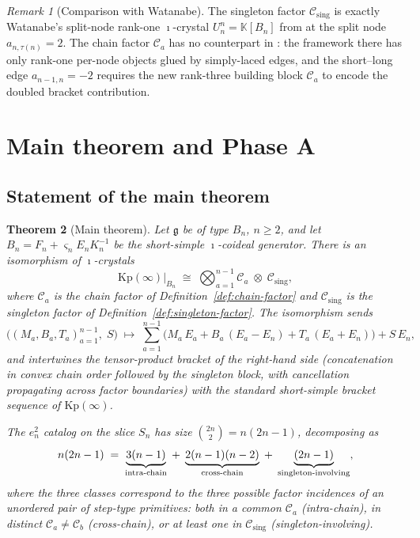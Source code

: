 \documentclass[11pt]{article}
\newtheorem{theorem}{Theorem}[section]
\theoremstyle{definition}
\theoremstyle{remark}
\newtheorem{remark}[theorem]{Remark}
\newcommand{\Kp}{\mathrm{Kp}}
\newcommand{\KK}{\mathbb{K}}
\newcommand{\g}{\mathfrak{g}}
\newcommand{\Cmid}{\mathcal{C}}
\newcommand{\Csing}{\mathcal{C}_{\mathrm{sing}}}
\begin{document}
\begin{remark}[Comparison with Watanabe]\label{rmk:watanabe-vs-chain}
The singleton factor $\Csing$ is exactly Watanabe's split-node rank-one $\imath$-crystal
$U^n_n = \KK[B_n]$ from \cite[\S4.1]{Watanabe2110} at the split node $a_{n,\tau(n)} = 2$.
The chain factor $\Cmid_a$ has no counterpart in \cite{Watanabe2110}: the framework there has
only rank-one per-node objects glued by simply-laced edges, and the short--long edge $a_{n-1,n}
= -2$ requires the new rank-three building block $\Cmid_a$ to encode the doubled bracket
contribution.
\end{remark}

\section{Main theorem and Phase A}\label{sec:main}

\subsection{Statement of the main theorem}

\begin{theorem}[Main theorem]\label{thm:main}
Let $\g$ be of type $B_n$, $n \geq 2$, and let $B_n = F_n + \varsigma_n E_n K_n^{-1}$ be the
short-simple $\imath$-coideal generator. There is an isomorphism of $\imath$-crystals
\begin{equation}\label{eq:main}
\Kp(\infty)\big|_{B_n} \;\cong\; \bigotimes_{a=1}^{n-1} \Cmid_a \;\otimes\; \Csing,
\end{equation}
where $\Cmid_a$ is the chain factor of Definition~\ref{def:chain-factor} and $\Csing$ is the
singleton factor of Definition~\ref{def:singleton-factor}. The isomorphism sends
\[
\bigl((M_a, B_a, T_a)_{a=1}^{n-1},\; S\bigr) \;\longmapsto\;
\sum_{a=1}^{n-1} \bigl(M_a\, E_a + B_a\, (E_a - E_n) + T_a\, (E_a + E_n)\bigr) + S\, E_n,
\]
and intertwines the tensor-product bracket of the right-hand side (concatenation in convex
chain order followed by the singleton block, with cancellation propagating across factor
boundaries) with the standard short-simple bracket sequence of $\Kp(\infty)$.

The $e_n^2$ catalog on the slice $S_n$ has size $\binom{2n}{2} = n(2n - 1)$, decomposing as
\begin{equation}\label{eq:catalog-count}
n(2n - 1) \;=\; \underbrace{3(n-1)}_{\textnormal{intra-chain}} \;+\;
\underbrace{2(n-1)(n-2)}_{\textnormal{cross-chain}} \;+\;
\underbrace{(2n-1)}_{\textnormal{singleton-involving}},
\end{equation}
where the three classes correspond to the three possible factor incidences of an unordered
pair of step-type primitives: both in a common $\Cmid_a$ (intra-chain), in distinct $\Cmid_a
\neq \Cmid_b$ (cross-chain), or at least one in $\Csing$ (singleton-involving).
\end{theorem}
\end{document}
